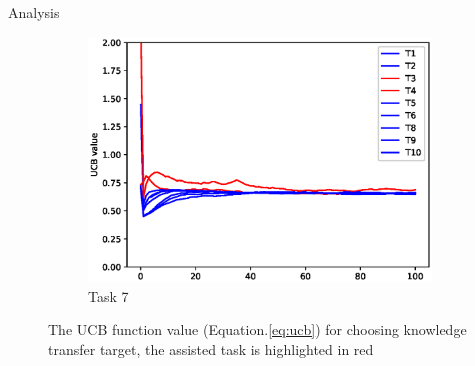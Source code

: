 \begin{frame}{Analysis}
\begin{figure}
\begin{subfigure}[b]{0.32\linewidth}
            \includegraphics[width=\linewidth]{figure/ucb/7.eps}
            \caption{Task 7}
        \end{subfigure}
        \caption{The UCB function value (Equation.\ref{eq:ucb}) for choosing knowledge transfer target, the assisted task is highlighted in red}
    \end{figure}
\end{frame}
